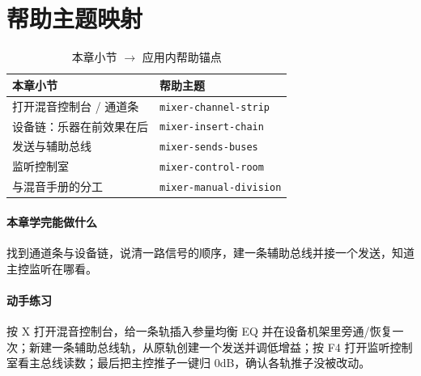 \section{帮助主题映射}

\begin{table}[htbp]
\centering
\caption{本章小节 $\to$ 应用内帮助锚点}
\label{tab:ch07-help}
\begin{tabular}{ll}
\hline
本章小节 & 帮助主题 \\
\hline
打开混音控制台 / 通道条 & \texttt{mixer-channel-strip} \\
设备链：乐器在前效果在后 & \texttt{mixer-insert-chain} \\
发送与辅助总线 & \texttt{mixer-sends-buses} \\
监听控制室 & \texttt{mixer-control-room} \\
与混音手册的分工 & \texttt{mixer-manual-division} \\
\hline
\end{tabular}
\end{table}

\paragraph{本章学完能做什么} 找到通道条与设备链，说清一路信号的顺序，建一条辅助总线并接一个发送，知道主控监听在哪看。

\paragraph{动手练习} 按 X 打开混音控制台，给一条轨插入参量均衡 EQ 并在设备机架里旁通/恢复一次；新建一条辅助总线轨，从原轨创建一个发送并调低增益；按 F4 打开监听控制室看主总线读数；最后把主控推子一键归 0dB，确认各轨推子没被改动。
